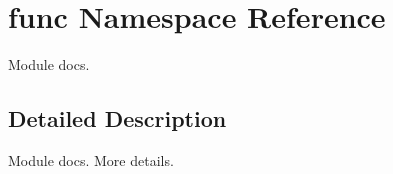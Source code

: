 \hypertarget{namespacefunc}{\section{func \-Namespace \-Reference}
\label{namespacefunc}
}


\-Module docs.  




\subsection{\-Detailed \-Description}
\-Module docs. \-More details. 